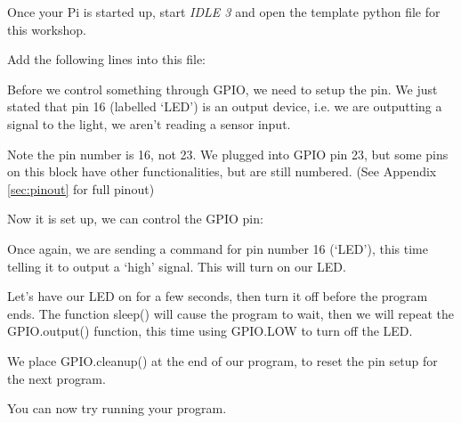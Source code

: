 			Once your Pi is started up, start \textit{IDLE 3} and open the template python file for this workshop.
		
			\newpage
			
			
			Add the following lines into this file:
			
			
			
			Before we control something through GPIO, we need to setup the pin. We just stated that pin 16 (labelled `LED') is an output device, i.e. we are outputting a signal to the light, we aren't reading a sensor input.
			
			Note the pin number is 16, not 23. We plugged into GPIO pin 23, but some pins on this block have other functionalities, but are still numbered. (See Appendix \ref{sec:pinout} for full pinout)
			
			Now it is set up, we can control the GPIO pin:
			
			
			
			Once again, we are sending a command for pin number 16 (`LED'), this time telling it to output a `high' signal. This will turn on our LED.
			
			Let's have our LED on for a few seconds, then turn it off before the program ends. The function sleep() will cause the program to wait, then we will repeat the GPIO.output() function, this time using GPIO.LOW to turn off the LED.
			
			
			
			We place GPIO.cleanup() at the end of our program, to reset the pin setup for the next program.
			
			You can now try running your program.
		
